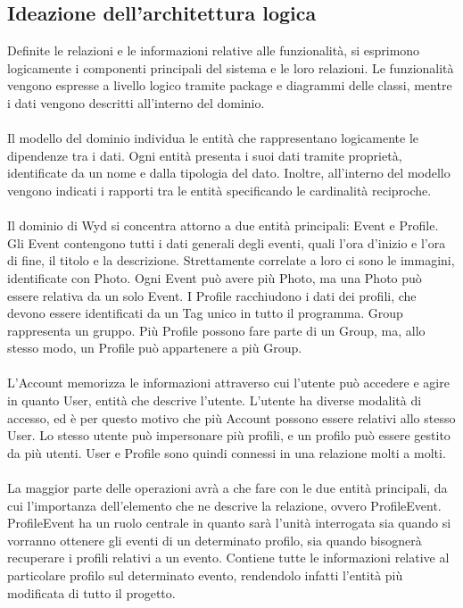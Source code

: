 \clearpage




\subsection{Ideazione dell'architettura logica}
Definite le relazioni e le informazioni relative alle funzionalità,
si esprimono logicamente i componenti principali del sistema e le loro relazioni.
Le funzionalità vengono espresse a livello logico tramite package e diagrammi delle classi,
mentre i dati vengono descritti all'interno del dominio. \\
\\
Il modello del dominio individua le entità che rappresentano logicamente le dipendenze tra i dati.
Ogni entità presenta i suoi dati tramite proprietà,
identificate da un nome e dalla tipologia del dato.
Inoltre, all'interno del modello vengono indicati i rapporti tra le entità specificando le cardinalità reciproche.\\
\\
Il dominio di Wyd si concentra attorno a due entità principali: Event e Profile.\\
Gli Event contengono tutti i dati generali degli eventi,
quali l'ora d'inizio e l'ora di fine, il titolo e la descrizione.
Strettamente correlate a loro ci sono le immagini, identificate con Photo.
Ogni Event può avere più Photo, ma una Photo può essere relativa da un solo Event.
I Profile racchiudono i dati dei profili, che devono essere identificati da un Tag unico in tutto il programma.
Group rappresenta un gruppo.
Più Profile possono fare parte di un Group, ma, allo stesso modo, un Profile può appartenere a più Group.\\
\\
L'Account memorizza le informazioni attraverso cui l'utente può accedere e
agire in quanto User, entità che descrive l'utente.
L'utente ha diverse modalità di accesso,
ed è per questo motivo che più Account possono essere relativi allo stesso User.
Lo stesso utente può impersonare più profili,
e un profilo può essere gestito da più utenti.
User e Profile sono quindi connessi in una relazione molti a molti.\\
\\
La maggior parte delle operazioni avrà a che fare con le due entità principali,
da cui l'importanza dell'elemento che ne descrive la relazione, ovvero ProfileEvent.\\
ProfileEvent ha un ruolo centrale in quanto sarà l'unità interrogata
sia quando si vorranno ottenere gli eventi di un determinato profilo,
sia quando bisognerà recuperare i profili relativi a un evento.
Contiene tutte le informazioni relative al particolare profilo sul determinato evento,
rendendolo infatti l'entità più modificata di tutto il progetto.\\
\\

